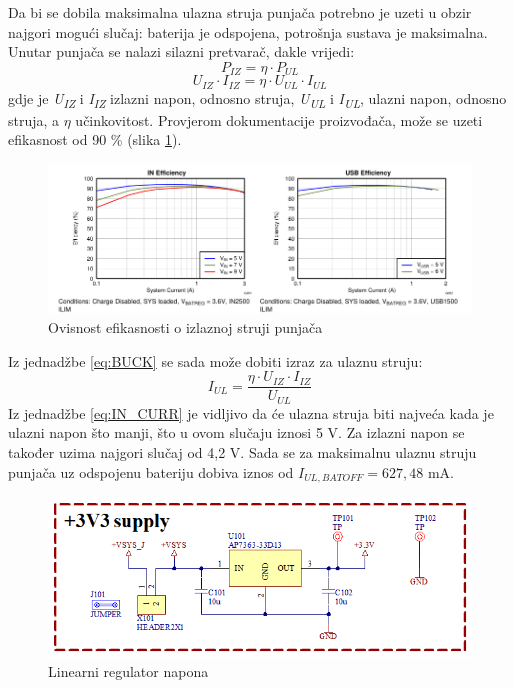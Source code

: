 Da bi se dobila maksimalna ulazna struja punjača potrebno je uzeti u obzir najgori mogući slučaj: baterija je odspojena, potrošnja sustava je maksimalna. Unutar punjača se nalazi silazni pretvarač, dakle vrijedi:
\begin{equation}
    P_{IZ}=\eta \cdot P_{UL}
\end{equation}
\begin{equation} \label{eq:BUCK}
    U_{IZ}\cdot I_{IZ}=\eta \cdot U_{UL} \cdot I_{UL}
\end{equation}
gdje je \textit{U\textsubscript{IZ}} i \textit{I\textsubscript{IZ}} izlazni napon, odnosno struja, \textit{U\textsubscript{UL}} i \textit{I\textsubscript{UL}}, ulazni napon, odnosno struja, a $\eta$ učinkovitost. Provjerom dokumentacije proizvođača, može se uzeti efikasnost od 90 \% (slika \ref{slk:EFFICIENCY}).
\begin{figure}[H]
    \centering
    \includegraphics[width=\textwidth]{Figures/EFFICIENCY.PNG}
    \caption{Ovisnost efikasnosti o izlaznoj struji punjača \cite{ti:bq24166}}
    \label{slk:EFFICIENCY}
\end{figure}
\noindent Iz jednadžbe \ref{eq:BUCK} se sada može dobiti izraz za ulaznu struju:
\begin{equation} \label{eq:IN_CURR}
    I_{UL}=\frac{\eta \cdot U_{IZ} \cdot I_{IZ}}{U_{UL}}
\end{equation}
Iz jednadžbe \ref{eq:IN_CURR} je vidljivo da će ulazna struja biti najveća kada je ulazni napon što manji, što u ovom slučaju iznosi 5 V. Za izlazni napon se također uzima najgori slučaj od 4,2 V. Sada se za maksimalnu ulaznu struju punjača uz odspojenu bateriju dobiva iznos od ${I_{UL,BATOFF} = 627,48\textrm{ mA}}$.
\begin{figure}[H]
    \centering
    \includegraphics[width = 10 cm]{Figures/MB_LDO.png}
    \caption{Linearni regulator napona}
    \label{slk:MB_LDO}
\end{figure}

